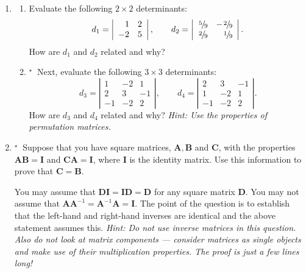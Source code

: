 \documentclass[11pt,a4paper]{article}
\def\ffrac#1#2{\leavevmode\kern.1em
\raise.5ex\hbox{\the\scriptfont0 #1}\kern-.1em
/\kern-.15em\lower.25ex\hbox{\the\scriptfont0 #2}}
\def\bA{\mathbf{A}}
\def\bB{\mathbf{B}}
\def\bC{\mathbf{C}}
\def\bD{\mathbf{D}}
\def\bI{\mathbf{I}}
\def\tough{$\!\!\!{}^\star\>$}
\begin{document}
\begin{enumerate}
\item\label{qdjsp2}
\begin{enumerate}
\item
Evaluate the following  $2\times 2$  determinants:
 $$ d_1= \left| \begin{array}{rr} 1&2 \\ -2 & 5 \end{array} \right| , \qquad
	d_2=  \left| \begin{array}{rr}  \ffrac{5}{9} &- \ffrac{2}{9}  \\  \ffrac{2}{9}  &  \ffrac{1}{9} \end{array} \right|. $$ 
How are  $d_1$ and $d_2$ related and why?
\item\tough
Next, evaluate the following  $3\times 3$ determinants:
 $$  d_3 = \left| \begin{array}{rrr} 1&-2&1 \\ 2 & 3 & -1\\-1&-2&2 \end{array} \right|, \qquad
	d_4=  \left| \begin{array}{rrr}2 & 3 & -1\\  1&-2&1 \\ -1&-2&2 \end{array} \right|. $$ 
How are  $d_3$ and $d_4$  related and why? \emph{Hint:  Use the properties of permutation matrices.}
\end{enumerate}
%



\item\label{q1205}\tough
Suppose that you have square matrices, $\bA, \bB$ and $\bC$, with the properties
$\bA\bB=\bI$ and $\bC\bA =\bI$, where $\bI$ is the identity matrix.
Use this information to prove that $\bC = \bB$.

You may assume that  $\bD \bI = \bI\bD = \bD$  for any square matrix $\bD$. You may
not assume that $\bA \bA^{-1} = \bA^{-1} \bA = \bI$. 
The  point of the question is to establish that the
left-hand and right-hand inverses are identical and the above  statement assumes this.
\emph{Hint: Do not use  inverse matrices in this question. 
Also do not look at matrix components --- consider
matrices as single objects and make use of their multiplication properties. 
The proof is just a few lines long!}


%

\end{enumerate}
\end{document}
